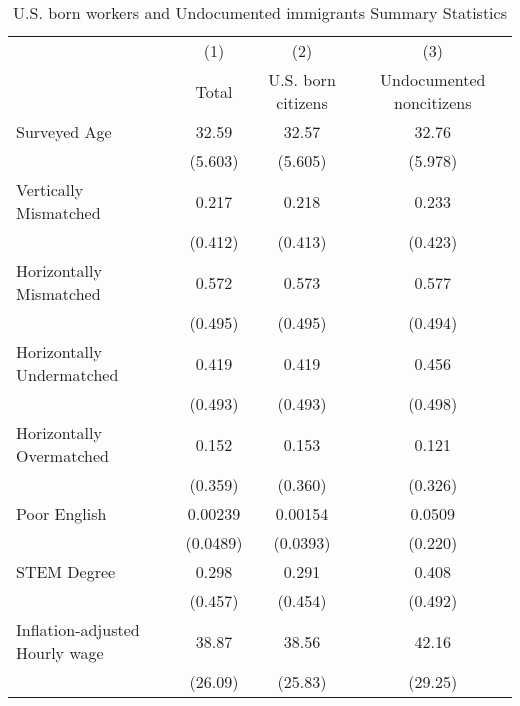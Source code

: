 \begin{table}[htbp]\centering
\def\sym#1{\ifmmode^{#1}\else\(^{#1}\)\fi}
\caption{U.S. born workers and Undocumented immigrants Summary Statistics \label{tab:sum}}
\begin{tabular}{l*{3}{c}}
\hline\hline
                    &\multicolumn{1}{c}{(1)}         &\multicolumn{1}{c}{(2)}         &\multicolumn{1}{c}{(3)}         \\
                    &       Total         &U.S. born citizens         &Undocumented noncitizens         \\
\hline
Surveyed Age        &       32.59         &       32.57         &       32.76         \\
                    &     (5.603)         &     (5.605)         &     (5.978)         \\
[1em]
Vertically Mismatched&       0.217         &       0.218         &       0.233         \\
                    &     (0.412)         &     (0.413)         &     (0.423)         \\
[1em]
Horizontally Mismatched&       0.572         &       0.573         &       0.577         \\
                    &     (0.495)         &     (0.495)         &     (0.494)         \\
[1em]
Horizontally Undermatched&       0.419         &       0.419         &       0.456         \\
                    &     (0.493)         &     (0.493)         &     (0.498)         \\
[1em]
Horizontally Overmatched&       0.152         &       0.153         &       0.121         \\
                    &     (0.359)         &     (0.360)         &     (0.326)         \\
[1em]
Poor English        &     0.00239         &     0.00154         &      0.0509         \\
                    &    (0.0489)         &    (0.0393)         &     (0.220)         \\
[1em]
STEM Degree         &       0.298         &       0.291         &       0.408         \\
                    &     (0.457)         &     (0.454)         &     (0.492)         \\
[1em]
Inflation-adjusted Hourly wage&       38.87         &       38.56         &       42.16         \\
                    &     (26.09)         &     (25.83)         &     (29.25)         \\

\end{tabular}
\end{table}
